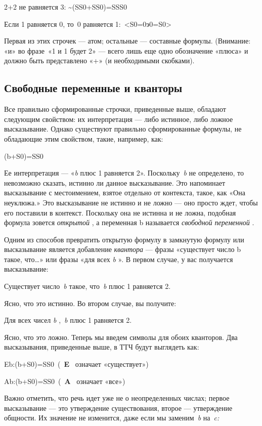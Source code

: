 \documentclass[../main.tex]{subfiles}
\begin{document}
2+2 не равняется 3: \textasciitilde(SS0+SS0)=SSS0

Если 1 равняется 0, то~0 равняется 1:~\textless S0=0э0=S0\textgreater{}

Первая из этих строчек --- атом; остальные --- составные формулы. (Внимание: «и» во фразе~«1 и 1 будет 2» --- всего лишь еще одно обозначение «плюса» и должно быть представлено «+» (и необходимыми скобками).


\subsection{Свободные переменные и кванторы}

Все правильно сформированные строчки, приведенные выше, обладают следующим свойством: их интерпретация --- либо истинное, либо ложное высказывание. Однако существуют правильно сформированные формулы, не обладающие этим свойством, такие, например, как:

(b+S0)=SS0

Ее интерпретация --- «\emph{b} плюс 1 равняется 2». Поскольку~\emph{b} не определено, то невозможно сказать, истинно ли данное высказывание. Это напоминает высказывание с местоимением, взятое отдельно от контекста, такое, как «Она неуклюжа.» Это высказывание не истинно и не ложно --- оно просто ждет, чтобы его поставили в контекст. Поскольку она не истинна и не ложна, подобная формула зовется \emph{открытой} , а переменная b называется \emph{свободной переменной} .

Одним из способов превратить открытую формулу в замкнутую формулу или высказывание является добавление \emph{квантора} --- фразы «существует число b такое, что\ldots» или фразы «для всех \emph{b} ». В первом случае, у вас получается высказывание:

Существует число~\emph{b} такое, что~\emph{b} плюс 1 равняется 2.

Ясно, что это истинно. Во втором случае, вы получите:

Для всех чисел \emph{b} ,~\emph{b} плюс 1 равняется 2.

Ясно, что это ложно. Теперь мы введем символы для обоих кванторов. Два высказывания, приведенные выше, в ТТЧ будут выглядеть как:

Eb:(b+S0)=SS0~(~\textbf{E} ~означает «существует»)

Ab:(b+S0)=SS0~(~\textbf{A} ~означает «все»)

Важно отметить, что речь идет уже не о неопределенных числах; первое высказывание --- это утверждение существования, второе --- утверждение общности. Их значение не изменится, даже если мы заменим~\emph{b} на~\emph{c:}
\end{document}
